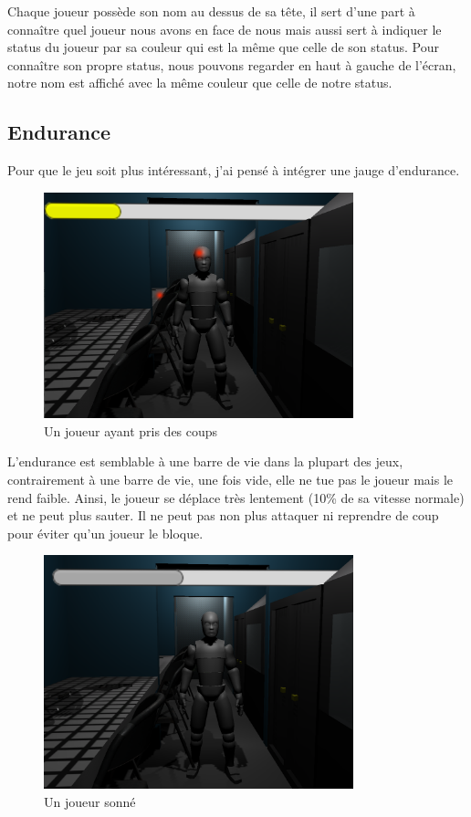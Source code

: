 \documentclass{article}
\begin{document}

Chaque joueur possède son nom au dessus de sa tête, il sert d'une part à connaître quel joueur nous avons en face de nous mais aussi sert à indiquer le status du joueur par sa couleur qui est la même que celle de son status.
Pour connaître son propre status, nous pouvons regarder en haut à gauche de l'écran, notre nom est affiché avec la même couleur que celle de notre status.

\subsection{Endurance}

Pour que le jeu soit plus intéressant, j'ai pensé à intégrer une jauge d'endurance.

\begin{figure}[H]
    \centering
    \includegraphics[width=0.8\textwidth]{cc/stamina.png}
    \caption{Un joueur ayant pris des coups}
    \label{cc_a}
\end{figure}

L'endurance est semblable à une barre de vie dans la plupart des jeux, contrairement à une barre de vie, une fois vide, elle ne tue pas le joueur mais le rend faible. Ainsi, le joueur se déplace très lentement (10\% de sa vitesse normale) et ne peut plus sauter. Il ne peut pas non plus attaquer ni reprendre de coup pour éviter qu'un joueur le bloque.

\begin{figure}[H]
    \centering
    \includegraphics[width=0.8\textwidth]{cc/stamina_stunned.png}
    \caption{Un joueur sonné}
    \label{cc_b}
\end{figure}
\end{document}
